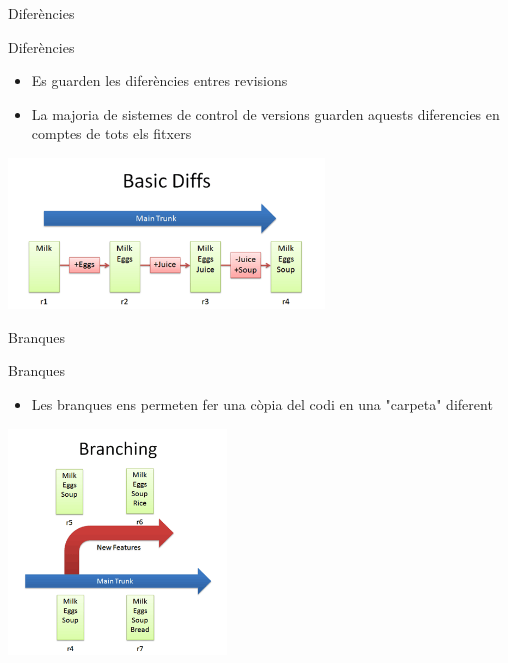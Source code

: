 \documentclass[10pt,xcolor={rgb}]{beamer}
\begin{document}
    \begin{frame}[fragile]{Diferències}
      
            \begin{block}{Diferències}
      
              \begin{itemize}
                \item Es guarden les diferències entres revisions
                \item La majoria de sistemes de control de versions guarden aquests diferencies en comptes de tots els fitxers
              \end{itemize}

              \centering
              \includegraphics[height=4cm]{basic_diffs.png}
      
            \end{block}
      
    \end{frame}


    \begin{frame}[fragile]{Branques}
      
            \begin{block}{Branques}
      
              \begin{itemize}
                \item Les branques ens permeten fer una còpia del codi en una "carpeta" diferent
                
              \end{itemize}

              \centering
              \includegraphics[height=6cm]{first_branch.png}
      
            \end{block}
      
    \end{frame}
\end{document}
